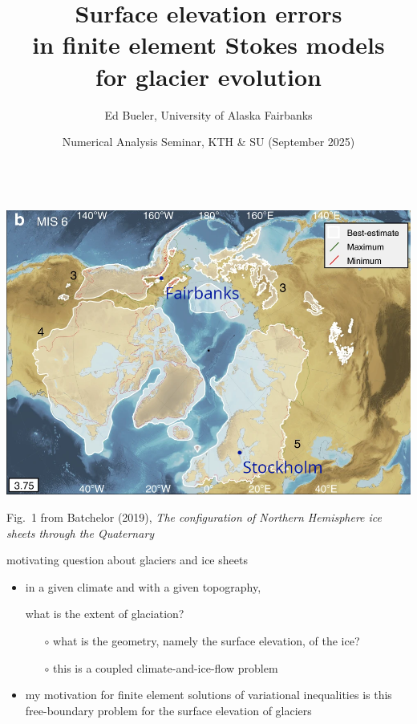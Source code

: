 \documentclass[10pt,svgnames]{beamer}
\title{Surface elevation errors \\ in finite element Stokes models \\ for glacier evolution}
\date{Numerical Analysis Seminar, KTH \& SU (September 2025)}
\author{Ed Bueler, University of Alaska Fairbanks}
\newcommand{\aler}[1]{{\color{FireBrick} #1}}
\begin{document}
\graphicspath{{figs/}{../../paper/figs/}}

\maketitle


\begin{frame}[plain]

\mbox{\hspace{-9mm} \includegraphics[width=1.15\textwidth]{nhsheets.png}}

\vspace{-2mm}
\hfill {\tiny Fig.~1 from Batchelor (2019), \emph{The configuration of Northern Hemisphere ice sheets through the Quaternary}}
\end{frame}


\begin{frame}{motivating question about glaciers and ice sheets}

\begin{itemize}
\item in a given climate and with a given topography,

\begin{center}
\aler{what is the extent of glaciation?}
\end{center}

    \begin{itemize}
    \item[$\circ$] what is the geometry, namely the surface elevation, of the ice?
    \item[$\circ$] this is a coupled climate-and-ice-flow problem
    \end{itemize}

\bigskip
\item my motivation for \aler{finite element solutions of variational inequalities} is this free-boundary problem for the surface elevation of glaciers
\end{itemize}
\end{frame}
\end{document}
